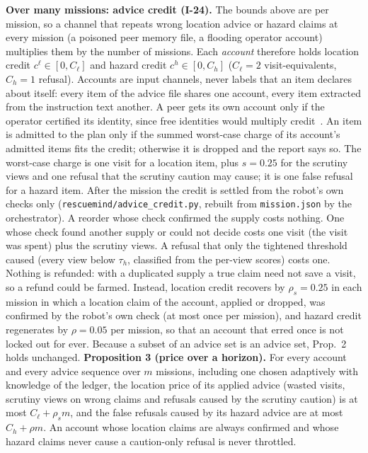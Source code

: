 \documentclass[conference]{IEEEtran}
\newcommand{\tauh}{\tau_{h}}
\begin{document}
\textbf{Over many missions: advice credit (I-24).} The bounds above are per mission, so a channel that repeats wrong location advice or hazard claims at every mission (a poisoned peer memory file, a flooding operator account) multiplies them by the number of missions. Each \emph{account} therefore holds location credit $c^{\ell}\in[0,C_\ell]$ and hazard credit $c^{h}\in[0,C_h]$ ($C_\ell=2$ visit-equivalents, $C_h=1$ refusal). Accounts are input channels, never labels that an item declares about itself: every item of the advice file shares one account, every item extracted from the instruction text another. A peer gets its own account only if the operator certified its identity, since free identities would multiply credit~\cite{douceur2002sybil,friedman2001cheap}. An item is admitted to the plan only if the summed worst-case charge of its account's admitted items fits the credit; otherwise it is dropped and the report says so. The worst-case charge is one visit for a location item, plus $s=0.25$ for the scrutiny views and one refusal that the scrutiny caution may cause; it is one false refusal for a hazard item. After the mission the credit is settled from the robot's own checks only (\texttt{rescuemind/advice\_credit.py}, rebuilt from \texttt{mission.json} by the orchestrator). A reorder whose check confirmed the supply costs nothing. One whose check found another supply or could not decide costs one visit (the visit was spent) plus the scrutiny views. A refusal that only the tightened threshold caused (every view below $\tauh$, classified from the per-view scores) costs one. Nothing is refunded: with a duplicated supply a true claim need not save a visit, so a refund could be farmed. Instead, location credit recovers by $\rho_s=0.25$ in each mission in which a location claim of the account, applied or dropped, was confirmed by the robot's own check (at most once per mission), and hazard credit regenerates by $\rho=0.05$ per mission, so that an account that erred once is not locked out for ever. Because a subset of an advice set is an advice set, Prop.~2 holds unchanged.
\textbf{Proposition 3 (price over a horizon).} For every account and every advice sequence over $m$ missions, including one chosen adaptively with knowledge of the ledger, the location price of its applied advice (wasted visits, scrutiny views on wrong claims and refusals caused by the scrutiny caution) is at most $C_\ell+\rho_s m$, and the false refusals caused by its hazard advice are at most $C_h+\rho m$. An account whose location claims are always confirmed and whose hazard claims never cause a caution-only refusal is never throttled.
\end{document}
